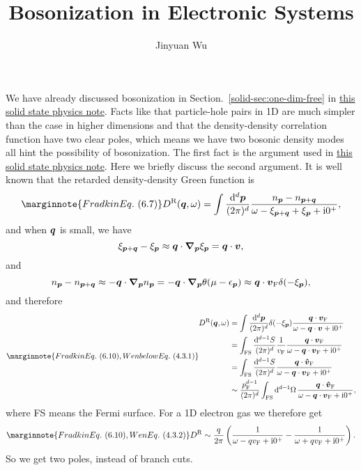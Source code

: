 \documentclass[hyperref, a4paper]{article}
\title{Bosonization in Electronic Systems}
\author{Jinyuan Wu}
\newcommand*{\ii}{\mathrm{i}}
\newcommand{\soliddoc}{\href{../solid/solid.pdf}{this solid state physics note}}
\begin{document}
    
\maketitle

We have already discussed bosonization in Section.~\ref{solid-sec:one-dim-free} in \soliddoc.
Facts like that particle-hole pairs in 1D are much simpler than the case in higher dimensions and that the density-density correlation function have two clear poles, which means we have two bosonic density modes 
all hint the possibility of bosonization.
The first fact is the argument used in \soliddoc. Here we briefly discuss the second argument.
It is well known that the retarded density-density Green function is 
\begin{equation} \marginnote{Fradkin Eq.~(6.7)}
    D^\text{R}(\vb*{q}, \omega) = \int \frac{\dd[d]{\vb*{p}}}{(2\pi)^d} \frac{n_{\vb*{p}} - n_{\vb*{p} + \vb*{q}}}{\omega - \xi_{\vb*{p} + \vb*{q}} + \xi_{\vb*{p}} + \ii 0^+},
\end{equation}
and when $\vb*{q}$ is small, we have 
\[
    \xi_{\vb*{p} + \vb*{q}} - \xi_{\vb*{p}} \approx \vb*{q} \cdot \grad_{\vb*{p}} \xi_{\vb*{p}} = \vb*{q} \cdot \vb*{v},
\]
and 
\[
    n_{\vb*{p}} - n_{\vb*{p} + \vb*{q}} \approx - \vb*{q} \cdot \grad_{\vb*{p}}{n_{\vb*{p}}} = 
    - \vb*{q} \cdot \grad_{\vb*{p}} \theta(\mu - \epsilon_{\vb*{p}}) \approx \vb*{q} \cdot \vb*{v}_\text{F} \delta(- \xi_{\vb*{p}}),
\]
and therefore 
\begin{equation} \marginnote{Fradkin Eq.~(6.10), Wen below Eq.~(4.3.1)}
    \begin{aligned}
        D^\text{R}(\vb*{q}, \omega) &= \int \frac{\dd[d]{\vb*{p}}}{(2\pi)^d} \delta(-\xi_{\vb*{p}}) \frac{\vb*{q} \cdot \vb*{v}_\text{F}}{\omega - \vb*{q} \cdot \vb*{v} + \ii 0^+} \\
        &= \int_\text{FS} \frac{\dd[d-1]{S}}{(2\pi)^d} \frac{1}{v_\text{F}} \frac{\vb*{q} \cdot \vb*{v}_\text{F}}{\omega - \vb*{q} \cdot \vb*{v}_\text{F} + \ii 0^+}  \\
        &= \int_\text{FS} \frac{\dd[d-1]{S}}{(2\pi)^d} \frac{\vb*{q} \cdot \vu*{v}_\text{F}}{\omega - \vb*{q} \cdot \vb*{v}_\text{F} + \ii 0^+} \\
        &\sim \frac{p_\text{F}^{d-1}}{(2\pi)^d} \int_\text{FS} \dd[d-1]{\Omega} \frac{\vb*{q} \cdot \vu*{v}_\text{F}}{\omega - \vb*{q} \cdot \vb*{v}_\text{F} + \ii 0^+} ,
    \end{aligned}
\end{equation}
where FS means the Fermi surface. For a 1D electron gas we therefore get 
\begin{equation} \marginnote{Fradkin Eq.~(6.10), Wen Eq.~(4.3.2)}
    D^\text{R} \sim \frac{q}{2\pi} \left( \frac{1}{\omega - q v_\text{F} + \ii 0^+} - \frac{1}{\omega + q v_\text{F} + \ii 0^+} \right). 
\end{equation}
So we get two poles, instead of branch cuts. 
\end{document}

